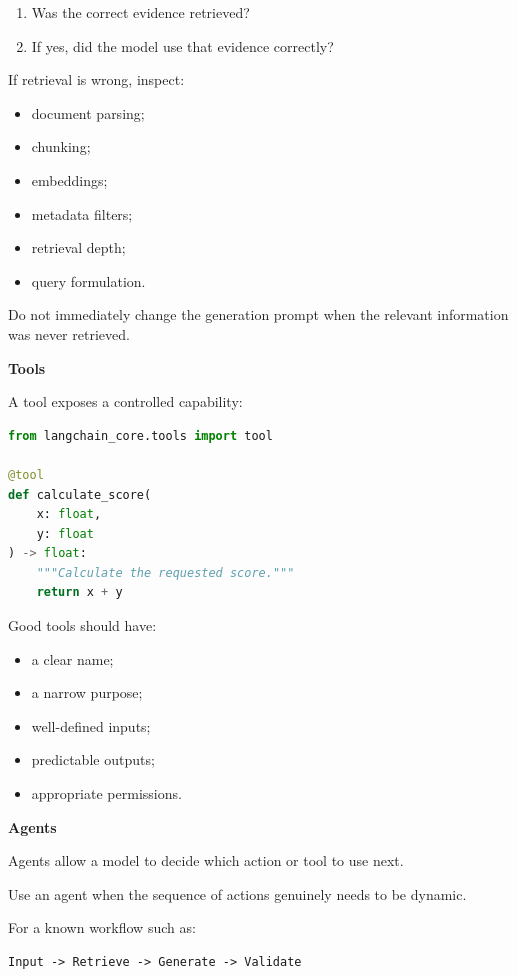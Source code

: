 \documentclass[11pt,letterpaper]{article}
\begin{document}
\begin{enumerate}[leftmargin=*]
    \item Was the correct evidence retrieved?
    \item If yes, did the model use that evidence correctly?
\end{enumerate}

If retrieval is wrong, inspect:

\begin{itemize}[leftmargin=*]
    \item document parsing;
    \item chunking;
    \item embeddings;
    \item metadata filters;
    \item retrieval depth;
    \item query formulation.
\end{itemize}

Do not immediately change the generation prompt when the relevant information
was never retrieved.

\textbf{Tools}

A tool exposes a controlled capability:

\begin{lstlisting}[language=Python]
from langchain_core.tools import tool

@tool
def calculate_score(
    x: float,
    y: float
) -> float:
    """Calculate the requested score."""
    return x + y
\end{lstlisting}

Good tools should have:

\begin{itemize}[leftmargin=*]
    \item a clear name;
    \item a narrow purpose;
    \item well-defined inputs;
    \item predictable outputs;
    \item appropriate permissions.
\end{itemize}

\textbf{Agents}

Agents allow a model to decide which action or tool to use next.

Use an agent when the sequence of actions genuinely needs to be dynamic.

For a known workflow such as:

\begin{lstlisting}
Input -> Retrieve -> Generate -> Validate
\end{lstlisting}
\end{document}
